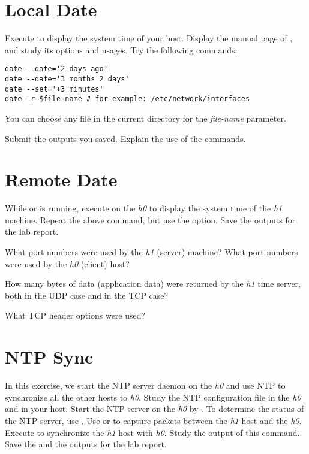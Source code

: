 \documentclass{../UTNetLab}
\begin{document}
\section{Local Date}
Execute  to display the system time of your host.
Display the manual page of , and study its options and usages.
Try the following  commands:

\begin{lstlisting}[emph={$file-name}]
date --date='2 days ago'
date --date='3 months 2 days'
date --set='+3 minutes'
date -r $file-name # for example: /etc/network/interfaces
    \end{lstlisting}
You can choose any file in the current directory for the \textit{file-name} parameter.

\begin{report}
    \item Submit the  outputs you saved.
    Explain the use of the commands.
\end{report}

\section{Remote Date}
While  or  is running, execute  on the \textit{h0} to display the system time of the \textit{h1} machine.
Repeat the above  command, but use the  option.
Save the  outputs for the lab report.

\begin{report}
    \item What port numbers were used by the \textit{h1} (server) machine?
    What port numbers were used by the \textit{h0} (client) host?

    \item How many bytes of data (application data) were returned by the \textit{h1} time server, both in the UDP case and in the TCP case?

    \item What TCP header options were used?
\end{report}

\section{NTP Sync}
In this exercise, we start the NTP server daemon on the \textit{h0} and use NTP to synchronize all the other hosts to \textit{h0}.
Study the NTP configuration file  in the \textit{h0} and in your host.
Start the NTP server on the \textit{h0} by .
To determine the status of the NTP server, use .
Use  or  to capture packets between the \textit{h1} host and the \textit{h0}.
Execute  to synchronize the \textit{h1} host with \textit{h0}.
Study the output of this command.
Save the  and the  outputs for the lab report.
\end{document}
